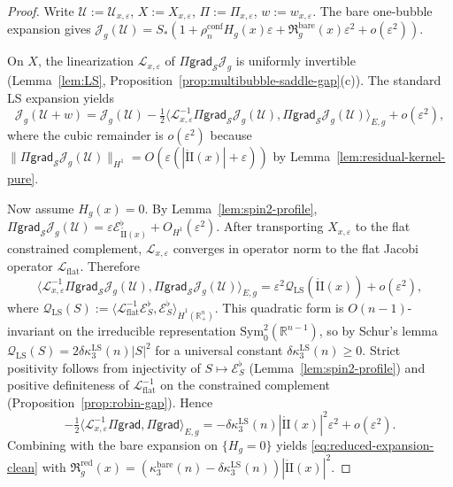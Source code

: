 \documentclass[11pt,reqno,a4paper]{amsart}
\numberwithin{equation}{section}
\theoremstyle{plain}
\theoremstyle{remark}
\theoremstyle{plain}
\begin{document}
\begin{proof}
Write $\mathcal U:=\mathcal U_{x,\varepsilon}$, $X:=X_{x,\varepsilon}$,
$\Pi:=\Pi_{x,\varepsilon}$, $w:=w_{x,\varepsilon}$.
The bare one-bubble expansion gives
$\mathcal J_g(\mathcal U)
=S_\ast(1+\rho_n^{\mathrm{conf}}H_g(x)\varepsilon
+\mathfrak R_g^{\mathrm{bare}}(x)\varepsilon^2+o(\varepsilon^2))$.

On $X$, the linearization $\mathcal L_{x,\varepsilon}$ of
$\Pi\mathsf{grad}_{\mathcal S}\mathcal J_g$ is uniformly invertible
(Lemma~\ref{lem:LS}, Proposition~\ref{prop:multibubble-saddle-gap}\textup{(c)}).
The standard LS expansion yields
\[
\mathcal J_g(\mathcal U+w)
=\mathcal J_g(\mathcal U)
-\tfrac12\big\langle
\mathcal L_{x,\varepsilon}^{-1}\Pi\mathsf{grad}_{\mathcal S}\mathcal J_g(\mathcal U),
\Pi\mathsf{grad}_{\mathcal S}\mathcal J_g(\mathcal U)
\big\rangle_{E,g}
+o(\varepsilon^2),
\]
where the cubic remainder is $o(\varepsilon^2)$ because
$\|\Pi\mathsf{grad}_{\mathcal S}\mathcal J_g(\mathcal U)\|_{H^1}
=O(\varepsilon(|\mathring{\mathrm{II}}(x)|+\varepsilon))$
by Lemma~\ref{lem:residual-kernel-pure}.

Now assume $H_g(x)=0$. By Lemma~\ref{lem:spin2-profile},
$\Pi\mathsf{grad}_{\mathcal S}\mathcal J_g(\mathcal U)
=\varepsilon\mathcal E^{\flat}_{\mathring{\mathrm{II}}(x)}+O_{H^1}(\varepsilon^2)$.
After transporting $X_{x,\varepsilon}$ to the flat constrained complement,
$\mathcal L_{x,\varepsilon}$ converges in operator norm to the flat Jacobi operator
$\mathcal L_{\mathrm{flat}}$. Therefore
\[
\big\langle
\mathcal L_{x,\varepsilon}^{-1}\Pi\mathsf{grad}_{\mathcal S}\mathcal J_g(\mathcal U),
\Pi\mathsf{grad}_{\mathcal S}\mathcal J_g(\mathcal U)
\big\rangle_{E,g}
=\varepsilon^2\mathcal Q_{\mathrm{LS}}(\mathring{\mathrm{II}}(x))+o(\varepsilon^2),
\]
where
$\mathcal Q_{\mathrm{LS}}(S)
:=\langle\mathcal L_{\mathrm{flat}}^{-1}\mathcal E^{\flat}_{S},
\mathcal E^{\flat}_{S}\rangle_{\dot H^1(\mathbb R^n_+)}$.
This quadratic form is $O(n-1)$-invariant on the irreducible representation
$\mathrm{Sym}^2_0(\mathbb R^{n-1})$, so by Schur's lemma
$\mathcal Q_{\mathrm{LS}}(S)=2\delta\kappa_3^{\mathrm{LS}}(n)|S|^2$
for a universal constant $\delta\kappa_3^{\mathrm{LS}}(n)\ge0$.
Strict positivity follows from injectivity of $S\mapsto\mathcal E^{\flat}_S$
(Lemma~\ref{lem:spin2-profile}) and positive definiteness of
$\mathcal L_{\mathrm{flat}}^{-1}$ on the constrained complement
(Proposition~\ref{prop:robin-gap}).
Hence
\begin{equation}\label{eq:delta-kappa3-LS}
-\tfrac12\big\langle
\mathcal L_{x,\varepsilon}^{-1}\Pi\mathsf{grad},
\Pi\mathsf{grad}
\big\rangle_{E,g}
=-\delta\kappa_3^{\mathrm{LS}}(n)|\mathring{\mathrm{II}}(x)|^2\varepsilon^2+o(\varepsilon^2).
\end{equation}
Combining with the bare expansion on $\{H_g=0\}$ yields \eqref{eq:reduced-expansion-clean}
with $\mathfrak R_g^{\mathrm{red}}(x)
=(\kappa_3^{\mathrm{bare}}(n)-\delta\kappa_3^{\mathrm{LS}}(n))|\mathring{\mathrm{II}}(x)|^2$.


\end{proof}
\end{document}

